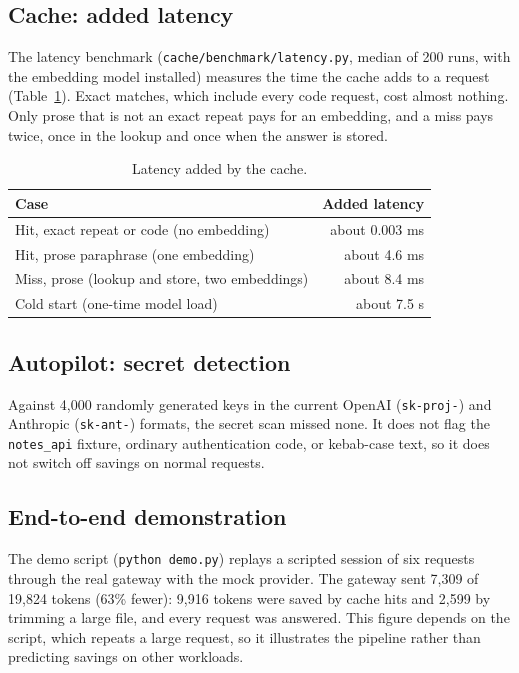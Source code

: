 \documentclass[12pt, a4paper, oneside]{report}
\newcommand{\code}[1]{\texttt{#1}}
\begin{document}
\subsection{Cache: added latency}

The latency benchmark (\code{cache/benchmark/latency.py}, median of 200 runs, with
the embedding model installed) measures the time the cache adds to a request
(Table~\ref{tab:latency}). Exact matches, which include every code request, cost
almost nothing. Only prose that is not an exact repeat pays for an embedding, and
a miss pays twice, once in the lookup and once when the answer is stored.

\begin{table}[H]
\centering
\begin{tabular}{lr}
\toprule
Case & Added latency \\
\midrule
Hit, exact repeat or code (no embedding)    & about 0.003 ms \\
Hit, prose paraphrase (one embedding)       & about 4.6 ms \\
Miss, prose (lookup and store, two embeddings) & about 8.4 ms \\
Cold start (one-time model load)            & about 7.5 s \\
\bottomrule
\end{tabular}
\caption{Latency added by the cache.}
\label{tab:latency}
\end{table}

\subsection{Autopilot: secret detection}

Against 4,000 randomly generated keys in the current OpenAI (\code{sk-proj-}) and
Anthropic (\code{sk-ant-}) formats, the secret scan missed none. It does not flag
the \code{notes\_api} fixture, ordinary authentication code, or kebab-case text,
so it does not switch off savings on normal requests.

\subsection{End-to-end demonstration}

The demo script (\code{python demo.py}) replays a scripted session of six requests
through the real gateway with the mock provider. The gateway sent 7,309 of 19,824
tokens (63\% fewer): 9,916 tokens were saved by cache hits and 2,599 by trimming a
large file, and every request was answered. This figure depends on the script,
which repeats a large request, so it illustrates the pipeline rather than
predicting savings on other workloads.
\end{document}

